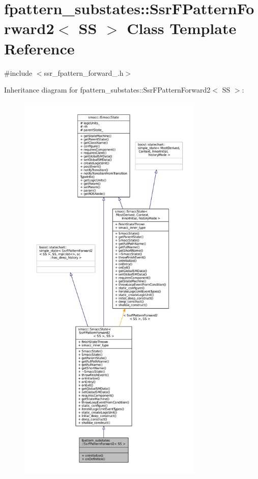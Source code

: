 \hypertarget{structfpattern__substates_1_1SsrFPatternForward2}{}\section{fpattern\+\_\+substates\+:\+:Ssr\+F\+Pattern\+Forward2$<$ SS $>$ Class Template Reference}
\label{structfpattern__substates_1_1SsrFPatternForward2}


{\ttfamily \#include $<$ssr\+\_\+fpattern\+\_\+forward\+\_.\+h$>$}



Inheritance diagram for fpattern\+\_\+substates\+:\+:Ssr\+F\+Pattern\+Forward2$<$ SS $>$\+:
\nopagebreak
\begin{figure}[H]
\begin{center}
\leavevmode
\includegraphics[height=550pt]{structfpattern__substates_1_1SsrFPatternForward2__inherit__graph}
\end{center}
\end{figure}



